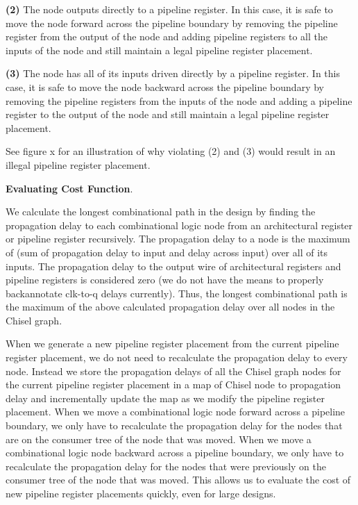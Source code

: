 {\bf (2)}  
The node outputs directly to a pipeline register. In this case, it is safe to move the node forward across the pipeline boundary by removing the pipeline register from the output of the node and adding pipeline registers to all the inputs of the node and still maintain a legal pipeline register placement. 

{\bf (3)} 
The node has all of its inputs driven directly by a pipeline register. In this case, it is safe to move the node backward across the pipeline boundary by removing the pipeline registers from the inputs of the node and adding a pipeline register to the output of the node and still maintain a legal pipeline register placement.

See figure x for an illustration of why violating (2) and (3) would result in an illegal pipeline register placement.

{\bf Evaluating Cost Function}.

We calculate the longest combinational path in the design by finding the propagation delay to each combinational logic node from an architectural register or pipeline register recursively. The propagation delay to a node is the maximum of (sum of propagation delay to input and delay across input) over all of its inputs. The propagation delay to the output wire of architectural registers and pipeline registers is considered zero (we do not have the means to properly backannotate clk-to-q delays currently).  Thus, the longest combinational path is the maximum of the above calculated propagation delay over all nodes in the Chisel graph.

When we generate a new pipeline register placement from the current pipeline register placement, we do not need to recalculate the propagation delay to every node. Instead we store the propagation delays of all the Chisel graph nodes for the current pipeline register placement in a map of Chisel node to propagation delay and incrementally update the map as we modify the pipeline register placement. When we move a combinational logic node forward across a pipeline boundary, we only have to recalculate the propagation delay for the nodes that are on the consumer tree of the node that was moved. When we move a combinational logic node backward across a pipeline boundary, we only have to recalculate the propagation delay for the nodes that were previously on the consumer tree of the node that was moved. This allows us to evaluate the cost of new pipeline register placements quickly, even for large designs.


